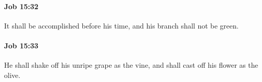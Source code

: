 		\paragraph{Job 15:32} %
			\label{JOB-15-32}

			It shall be accomplished before his time, and his branch shall not be green.


		\paragraph{Job 15:33} %
			\label{JOB-15-33}

			He shall shake off his unripe grape as the vine, and shall cast off his flower as the olive.


